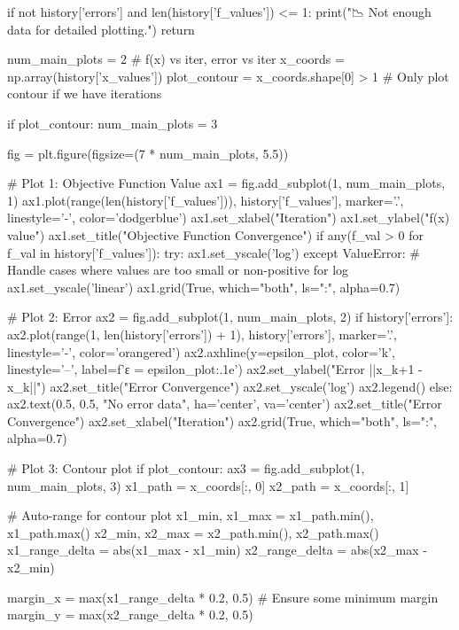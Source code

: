 \documentclass[12pt]{article} %
\begin{document}
\begin{python}
    if not history['errors'] and len(history['f_values']) <= 1:
        print("\n📉 Not enough data for detailed plotting.")
        return

    num_main_plots = 2 # f(x) vs iter, error vs iter
    x_coords = np.array(history['x_values'])
    plot_contour = x_coords.shape[0] > 1 # Only plot contour if we have iterations
    
    if plot_contour:
        num_main_plots = 3
        
    fig = plt.figure(figsize=(7 * num_main_plots, 5.5)) 

    # Plot 1: Objective Function Value
    ax1 = fig.add_subplot(1, num_main_plots, 1)
    ax1.plot(range(len(history['f_values'])), history['f_values'], marker='.', linestyle='-', color='dodgerblue')
    ax1.set_xlabel("Iteration")
    ax1.set_ylabel("f(x) value")
    ax1.set_title("Objective Function Convergence")
    if any(f_val > 0 for f_val in history['f_values']):
        try:
            ax1.set_yscale('log')
        except ValueError: # Handle cases where values are too small or non-positive for log
            ax1.set_yscale('linear')
    ax1.grid(True, which="both", ls=":", alpha=0.7)

    # Plot 2: Error
    ax2 = fig.add_subplot(1, num_main_plots, 2)
    if history['errors']:
        ax2.plot(range(1, len(history['errors']) + 1), history['errors'], marker='.', linestyle='-', color='orangered')
        ax2.axhline(y=epsilon_plot, color='k', linestyle='--', label=f'ε = {epsilon_plot:.1e}')
        ax2.set_ylabel("Error ||x_k+1 - x_k||")
        ax2.set_title("Error Convergence")
        ax2.set_yscale('log')
        ax2.legend()
    else:
        ax2.text(0.5, 0.5, "No error data", ha='center', va='center')
        ax2.set_title("Error Convergence")
    ax2.set_xlabel("Iteration")
    ax2.grid(True, which="both", ls=":", alpha=0.7)
    
    # Plot 3: Contour plot
    if plot_contour:
        ax3 = fig.add_subplot(1, num_main_plots, 3)
        x1_path = x_coords[:, 0]
        x2_path = x_coords[:, 1]
        
        # Auto-range for contour plot
        x1_min, x1_max = x1_path.min(), x1_path.max()
        x2_min, x2_max = x2_path.min(), x2_path.max()
        x1_range_delta = abs(x1_max - x1_min)
        x2_range_delta = abs(x2_max - x2_min)

        margin_x = max(x1_range_delta * 0.2, 0.5) # Ensure some minimum margin
        margin_y = max(x2_range_delta * 0.2, 0.5)
        

\end{python}
\end{document}
